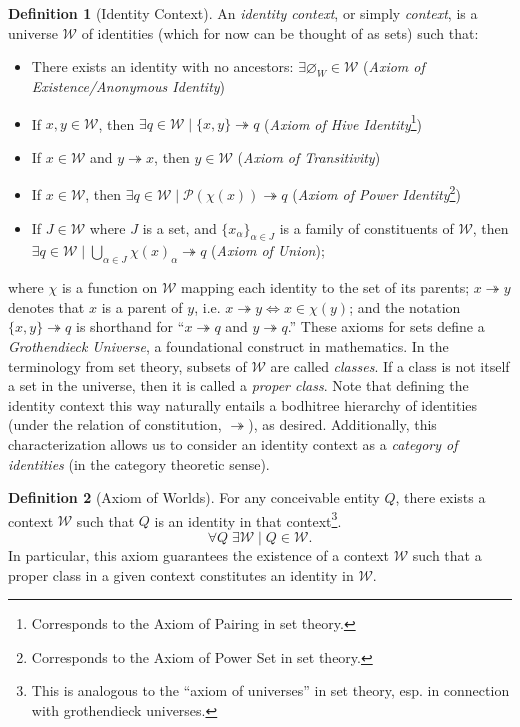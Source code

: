 \documentclass[pra,twocolumn,groupedaddress,10pt]{revtex4}
\theoremstyle{definition}
\newtheorem{defn}{Definition}[section]
\begin{document}
\begin{defn}[Identity Context] \label{def:idecon}
	An \emph{identity context}, or simply \emph{context}, is a universe $\mathcal{W}$ of identities (which for now can be thought of as sets) such that:
	\begin{itemize}
		\item There exists an identity with no ancestors: $\exists \varnothing_W \in \mathcal{W}$ (\emph{Axiom of Existence/Anonymous Identity})
		\item If $x, y \in \mathcal{W}$, then $\exists q \in \mathcal{W} \mid \{x,y\} \twoheadrightarrow q$ (\emph{Axiom of Hive Identity}\footnote{Corresponds to the Axiom of Pairing in set theory.})
		\item If $x \in \mathcal{W}$ and $y \twoheadrightarrow x$, then $y \in \mathcal{W}$ (\emph{Axiom of Transitivity})
		\item If $x \in \mathcal{W}$, then $\exists q \in \mathcal{W} \mid \mathscr{P}(\chi(x)) \twoheadrightarrow q$ (\emph{Axiom of Power Identity}\footnote{Corresponds to the Axiom of Power Set in set theory.})
		\item If $J \in \mathcal{W}$ where $J$ is a set, and $\{x_{\alpha}\}_{\alpha \in J}$ is a family of constituents of $\mathcal{W}$, then $\exists q \in \mathcal{W} \mid \bigcup_{\alpha \in J} {\chi(x)}_{\alpha} \twoheadrightarrow q$ (\emph{Axiom of Union});
	\end{itemize}
	where $\chi$ is a function on $\mathcal{W}$ mapping each identity to the set of its parents; $x \twoheadrightarrow y$ denotes that $x$ is a parent of $y$, i.e. $x \twoheadrightarrow y \iff x \in \chi(y)$; and the notation $\{x,y\} \twoheadrightarrow q$ is shorthand for ``$x \twoheadrightarrow q$ and $y \twoheadrightarrow q$.'' These axioms for sets define a \emph{Grothendieck Universe}\cite{grothendieck}\cite{foundcat}, a foundational construct in mathematics. In the terminology from set theory, subsets of $\mathcal{W}$ are called \emph{classes}. If a class is not itself a set in the universe, then it is called a \emph{proper class}.
	Note that defining the identity context this way naturally entails a bodhitree hierarchy of identities (under the relation of constitution, $\twoheadrightarrow$), as desired. Additionally, this characterization allows us to consider an identity context as a \emph{category of identities} (in the category theoretic sense).
\end{defn}

\begin{defn}[Axiom of Worlds]
	For any conceivable entity $Q$, there exists a context $\mathcal{W}$ such that $Q$ is an identity in that context\footnote{This is analogous to the ``axiom of universes''\cite{maclane} in set theory, esp. in connection with grothendieck universes.}.
	\begin{equation}
		\forall Q \; \exists \mathcal{W} \mid Q \in \mathcal{W}. \nonumber
	\end{equation}
	In particular, this axiom guarantees the existence of a context $\mathcal{W}$ such that a proper class in a given context constitutes an identity in $\mathcal{W}$.
\end{defn}
\end{document}
